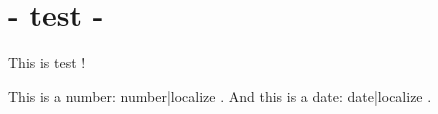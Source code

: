 \documentclass{article}
\begin{document}
\section{ {{- test -}} }

This is {{ test }}!

This is a number: {{ number|localize }}. And this is a date: {{ date|localize }}.

\end{document}
